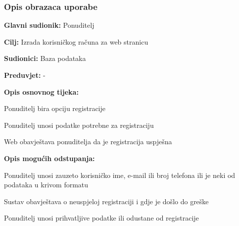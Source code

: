				\subsubsection{Opis obrazaca uporabe}				
					\noindent {}
					\begin{packed_item}
	
						\item \textbf{Glavni sudionik: } Ponuditelj
						\item  \textbf{Cilj:} Izrada korisničkog računa za web stranicu
						\item  \textbf{Sudionici:} Baza podataka
						\item  \textbf{Preduvjet:} -
						\item  \textbf{Opis osnovnog tijeka:}
						
						\item[] \begin{packed_enum}
	
							\item Ponuditelj bira opciju registracije
                            \item Ponuditelj unosi podatke potrebne za registraciju
							\item Web obavještava ponuditelja da je registracija uspješna
						\end{packed_enum}
						
						\item  \textbf{Opis mogućih odstupanja:}
						
						\item[] \begin{packed_item}
	
							\item[2.a] Ponuditelj unosi zauzeto korisničko ime, e-mail ili broj telefona ili je neki od podataka u krivom formatu
							\item[] \begin{packed_enum}
								
								\item Sustav obavještava o neuspjeloj registraciji i gdje je došlo do greške
								\item Ponuditelj unosi prihvatljive podatke ili odustane od registracije
								
							\end{packed_enum}
						\end{packed_item}
					\end{packed_item}

